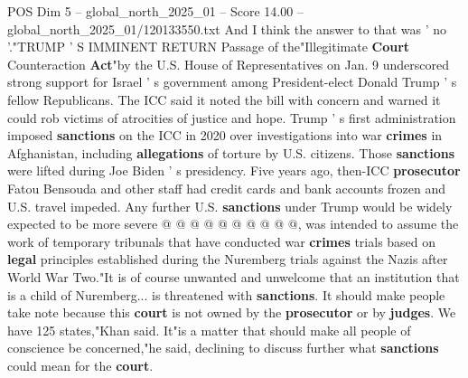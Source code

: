 \begin{textsample}{POS Dim 5 – global\_north\_2025\_01 – Score 14.00 – global\_north\_2025\_01/120133550.txt}
And I think the answer to that was ' no '."TRUMP ' S IMMINENT RETURN Passage of the"Illegitimate \textbf{Court} Counteraction \textbf{Act}"by the U.S.
House of Representatives on Jan. 9 underscored strong support for Israel ' s government among President-elect Donald Trump ' s fellow Republicans.
The ICC said it noted the bill with concern and warned it could rob victims of atrocities of justice and hope.
Trump ' s first administration imposed \textbf{sanctions} on the ICC in 2020 over investigations into war \textbf{crimes} in Afghanistan, including \textbf{allegations} of torture by U.S. citizens.
Those \textbf{sanctions} were lifted during Joe Biden ' s presidency.
Five years ago, then-ICC \textbf{prosecutor} Fatou Bensouda and other staff had credit cards and bank accounts frozen and U.S. travel impeded.
Any further U.S. \textbf{sanctions} under Trump would be widely expected to be more severe @ @ @ @ @ @ @ @ @ @, was intended to assume the work of temporary tribunals that have conducted war \textbf{crimes} trials based on \textbf{legal} principles established during the Nuremberg trials against the Nazis after World War Two."It is of course unwanted and unwelcome that an institution that is a child of Nuremberg... is threatened with \textbf{sanctions}.
It should make people take note because this \textbf{court} is not owned by the \textbf{prosecutor} or by \textbf{judges}.
We have 125 states,"Khan said.
It"is a matter that should make all people of conscience be concerned,"he said, declining to discuss further what \textbf{sanctions} could mean for the \textbf{court}.

\end{textsample}
